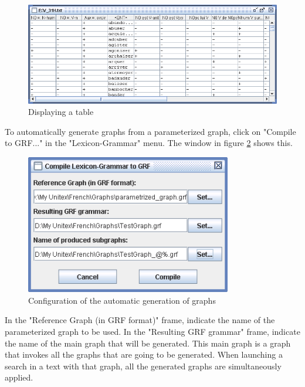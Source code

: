 \begin{figure}[!h]
\begin{center}
\includegraphics[width=15cm]{resources/img/fig8-6.png}
\caption{Displaying a table\label{fig-table-display}}
\end{center}
\end{figure}

\bigskip
\noindent To automatically generate graphs from a parameterized graph, click on "Compile to
GRF..." in the "Lexicon-Grammar" menu. The window in figure
\ref{fig-configuration-graph-generation} shows this.

\begin{figure}[!h]
\begin{center}
\includegraphics[width=9cm]{resources/img/fig8-7.png}
\caption{Configuration of the automatic generation of graphs\label{fig-configuration-graph-generation}}
\end{center}
\end{figure}

\bigskip
\noindent In the "Reference Graph (in GRF format)" frame, indicate the name of
the parameterized graph to be used. In the "Resulting GRF grammar" frame,
indicate the name of the main graph that will be generated. This main graph is a graph
that invokes all the graphs that are going to be generated. When launching a
search in a text with that graph, all the generated graphs are simultaneously
applied.

